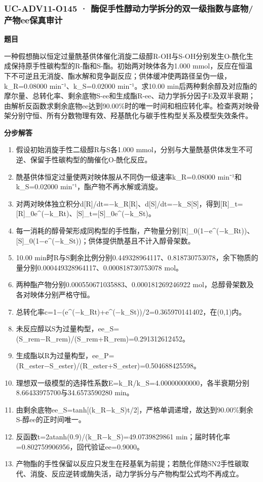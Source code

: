 \documentclass[UTF8,11pt,a4paper]{ctexart}
\begin{document}
\subsubsection*{UC-ADV11-O145 · 酶促手性醇动力学拆分的双一级指数与底物/产物ee保真审计}
\noindent\textbf{题目}\par
一种假想酶以恒定过量酰基供体催化消旋二级醇R-OH与S-OH分别发生O-酰化生成保持原手性碳构型的R-酯和S-酯。初始两对映体各为1.000 mmol，反应在恒温下不可逆且无消旋、酯水解和竞争副反应；供体缓冲使两路径呈伪一级，k\_R=0.08000 min⁻¹、k\_S=0.02000 min⁻¹。求10.00 min后两种剩余醇及对应酯的摩尔量、总转化率、剩余底物S-ee和生成酯R-ee、动力学拆分因子E及双半衰期；由解析反函数求剩余底物ee达到90.00\%时的唯一时间和相应转化率。检查两对映骨架分别守恒、所有分数物理有效、羟基酰化与碳手性构型关系及模型失效条件。\par
\medskip\noindent\textbf{分步解答}
\begin{enumerate}
\item 假设初始消旋手性二级醇R与S各1.000 mmol，分别与大量酰基供体发生不可逆、保留手性碳构型的酶催化O-酰化反应。
\item 酰基供体恒定过量使两对映体服从不同伪一级速率k\_R=0.08000 min⁻¹和k\_S=0.02000 min⁻¹，酯产物不再水解或消旋。
\item 对两对映体独立积分d[R]/dt=−k\_R[R]、d[S]/dt=−k\_S[S]，得到[R]\_t=[R]\_0e\textasciicircum{}(−k\_Rt)、[S]\_t=[S]\_0e\textasciicircum{}(−k\_St)。
\item 每一消耗的醇骨架形成同构型的手性酯，产物量分别[R]\_0(1−e\textasciicircum{}(−k\_Rt))、[S]\_0(1−e\textasciicircum{}(−k\_St))；供体提供酰基且不计入醇骨架数。
\item 10.00 min时R与S剩余比例分别0.449328964117、0.818730753078，余下物质的量分别0.000449328964117、0.000818730753078 mol。
\item 两种酯产物分别0.000550671035883、0.000181269246922 mol，总醇骨架数及各对映体分别严格守恒。
\item 总转化率c=1−(e\textasciicircum{}(−k\_Rt)+e\textasciicircum{}(−k\_St))/2=0.365970141402，在(0,1)内。
\item 未反应醇以S为过量构型，ee\_S=(S\_rem−R\_rem)/(S\_rem+R\_rem)=0.291312612452。
\item 生成酯以R为过量构型，ee\_P=(R\_ester−S\_ester)/(R\_ester+S\_ester)=0.504688425598。
\item 理想双一级模型的选择性系数E=k\_R/k\_S=4.00000000000，各半衰期分别8.66433975700与34.6573590280 min。
\item 由剩余底物ee\_S=tanh[(k\_R−k\_S)t/2]，严格单调递增，故达到90.00\%剩余S-醇ee的正时间唯一。
\item 反函数t=2atanh(0.9)/(k\_R−k\_S)=49.0739829861 min；届时转化率=0.802759906956，回代验证ee=0.9000。
\item 产物酯的手性保留以反应只发生在羟基氧为前提；若酰化伴随SN2手性碳取代、消旋、反应逆转或酶失活，动力学拆分与产物构型公式均不再成立。
\end{enumerate}
\end{document}
